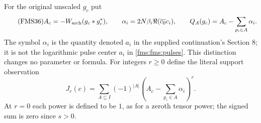 \documentclass[11pt,a4paper]{article}
\theoremstyle{definition}\newtheorem{definition}[theorem]{Definition}
\begin{document}
For the original unscaled $g_c$ put
\begin{equation}\tag{FMS36}\label{fms:fms:cornerparameters}
 A_c=-W_{\rm arch}(g_c*g_c^*),\qquad
 \alpha_i=2N\beta_i\Re(\overline{c_0}c_i),\qquad
 Q_A(g_c)=A_c-\sum_{p_i\in A}\alpha_i.
\end{equation}
The symbol $\alpha_i$ is the quantity denoted $a_i$ in the
supplied continuation's Section 8; it is not the logarithmic
pulse center $a_i$ in \eqref{fms:fms:pulses}. This distinction changes
no parameter or formula.
For integers $r\ge0$ define the literal support observation
\begin{equation}\tag{FMS37}\label{fms:fms:jr}
 J_r(c)=\sum_{A\subseteq I}(-1)^{|A|}
                   \left(A_c-\sum_{p_i\in A}\alpha_i\right)^r.
\end{equation}
At $r=0$ each power is defined to be $1$, as for a zeroth tensor
power; the signed sum is zero since $s>0$.
\end{document}
